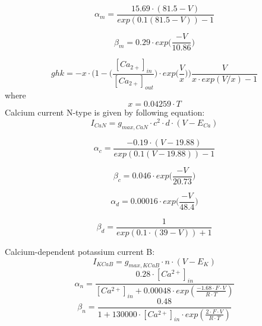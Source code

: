 \documentclass[a4paper,12pt]{article}
\begin{document}
\begin{equation}
\alpha_{m} = \frac{15.69 \cdot (81.5-V)}{exp(0.1(81.5-V)) - 1}
\end{equation}

\begin{equation}
\beta_{m} = 0.29 \cdot exp \Big(\frac{-V}{10.86}\Big)
\end{equation}

\begin{equation}
ghk = -x \cdot \Big(1 - \Big(\frac{[Ca_{2+}]_{in}}{[Ca_{2+}]_{out}} \Big) \cdot exp \Big(\frac{V}{x}\Big) \Big) \frac{V}{x \cdot exp(V/x) -1 }
\end{equation}
where
\begin{equation}
x = 0.04259 \cdot T
\end{equation}
Calcium current N-type is given by following equation: 
\begin{equation}
\label{eq:CavN}
I_{CaN} = g_{max, CaN} \cdot c^2 \cdot d \cdot (V - E_{Ca})
\end{equation}

\begin{equation}
\alpha_{c} = \frac{-0.19 \cdot (V - 19.88)}{exp(0.1(V - 19.88)) - 1}
\end{equation}

\begin{equation}
\beta_{c} = 0.046 \cdot exp \Big(\frac{-V}{20.73}\Big)
\end{equation}

\begin{equation}
\alpha_{d} = 0.00016 \cdot exp \Big(\frac{-V}{48.4}\Big)
\end{equation}

\begin{equation}
\beta_{d} = \frac{1}{exp(0.1 \cdot (39 - V)) + 1}
\end{equation}


Calcium-dependent potassium current B:
\begin{equation}
I_{KCaB} = g_{max, KCaB} \cdot n \cdot (V - E_K)
\label{eq:KvCaB}
\end{equation}
\begin{equation}
\alpha_n = \frac{0.28 \cdot [Ca^{2+}]_{in} }{ [Ca^{2+}]_{in} + 0.00048 \cdot exp(\frac{-1.68 \cdot F \cdot V}{R \cdot T})  } 
\end{equation}
\begin{equation}
\beta_n = \frac{0.48}{1 + 130000 \cdot [Ca^{2+}]_{in} \cdot exp(\frac{2 \cdot F \cdot V}{R \cdot T})}
\end{equation}
\end{document}
